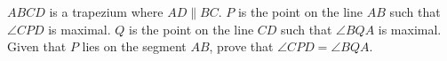 $ABCD$ is a trapezium where $AD\parallel BC$. $P$ is the point on the line $AB$ such that $\angle CPD$ is maximal. $Q$ is the point on the line $CD$ such that $\angle BQA$ is maximal. Given that $P$ lies on the segment $AB$,  prove that $\angle CPD=\angle BQA$.